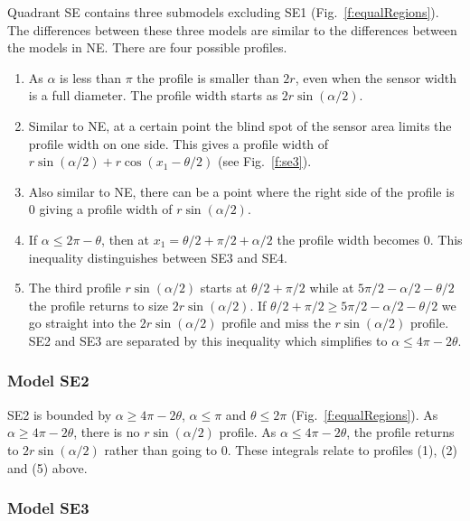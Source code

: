 Quadrant SE contains three submodels excluding SE1  (Fig.~\ref{f:equalRegions}). The differences between these three models are similar to the differences between the models in NE. There are four possible profiles.
\begin{enumerate}
\item As $\alpha$ is less than $\pi$ the profile is smaller than $2r$, even when the sensor width is a full diameter. The profile width starts as $2r\sin(\alpha/2)$.
\item Similar to NE, at a certain point the blind spot of the sensor area limits the profile width on one side. This gives a profile width of $r\sin(\alpha/2) + r\cos(x_1 - \theta/2)$ (see Fig.~\ref{f:se3}).
\item Also similar to NE, there can be a point where the right side of the profile is 0 giving a profile width of $r\sin(\alpha/2)$. 
\item If $\alpha \le 2\pi - \theta$, then at $x_1 = \theta/2 + \pi/2 + \alpha/2 $ the profile width becomes 0. This inequality distinguishes between SE3 and SE4. 
\item The third profile $r\sin(\alpha/2)$ starts at $\theta/2 + \pi/2$ while at $5\pi/2 - \alpha/2 - \theta/2$ the profile returns to size $2r\sin(\alpha/2)$. If $\theta/2 + \pi/2 \ge 5\pi/2 - \alpha/2 - \theta/2$ we go straight into the  $2r\sin(\alpha/2)$ profile and miss the $r\sin(\alpha/2)$ profile.  SE2 and SE3 are separated by this inequality which simplifies to $\alpha \le 4\pi - 2\theta$. 

\end{enumerate}





\subsubsection{Model SE2} \label{SE2}

SE2 is bounded by $\alpha \ge 4\pi - 2\theta$, $\alpha \le \pi$ and $\theta \le 2\pi$ (Fig.~\ref{f:equalRegions}). As $\alpha \ge 4\pi - 2\theta$, there is no $r\sin(\alpha/2)$ profile. As $\alpha \le 4\pi - 2\theta$, the profile returns to $2r\sin(\alpha/2)$ rather than going to 0. These integrals relate to profiles (1), (2) and (5) above.




\subsubsection{Model SE3} \label{SE3}

